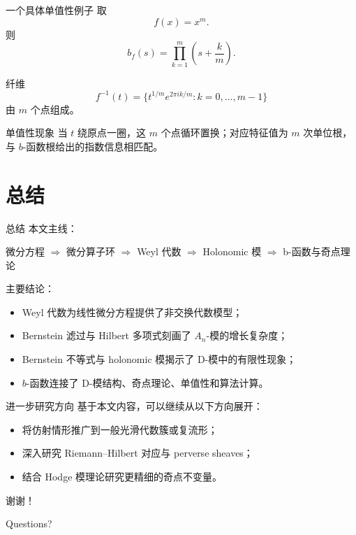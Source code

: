\documentclass[aspectratio=169,11pt]{ctexbeamer}
\begin{document}
\begin{frame}{一个具体单值性例子}
    取
    \[
        f(x)=x^m.
    \]
    则
    \[
        b_f(s)=\prod_{k=1}^m\left(s+\frac{k}{m}\right).
    \]

    纤维
    \[
        f^{-1}(t)=\{t^{1/m}e^{2\pi i k/m}:k=0,\dots,m-1\}
    \]
    由 $m$ 个点组成。

    \begin{block}{单值性现象}
        当 $t$ 绕原点一圈，这 $m$ 个点循环置换；对应特征值为 $m$ 次单位根，与 $b$-函数根给出的指数信息相匹配。
    \end{block}

\end{frame}






\section{总结}

\begin{frame}{总结}
    本文主线：

    \begin{center}
        微分方程
        $\Longrightarrow$
        微分算子环
        $\Longrightarrow$
        Weyl 代数
        $\Longrightarrow$
        Holonomic 模
        $\Longrightarrow$
        b-函数与奇点理论
    \end{center}

    \vspace{1em}
    主要结论：

    \begin{itemize}
        \item Weyl 代数为线性微分方程提供了非交换代数模型；
        \item Bernstein 滤过与 Hilbert 多项式刻画了 $A_n$-模的增长复杂度；
        \item Bernstein 不等式与 holonomic 模揭示了 D-模中的有限性现象；
        \item $b$-函数连接了 D-模结构、奇点理论、单值性和算法计算。
    \end{itemize}

\end{frame}

\begin{frame}{进一步研究方向}
    基于本文内容，可以继续从以下方向展开：

    \begin{itemize}
        \item 将仿射情形推广到一般光滑代数簇或复流形；
        \item 深入研究 Riemann--Hilbert 对应与 perverse sheaves；
        \item 结合 Hodge 模理论研究更精细的奇点不变量。
    \end{itemize}

\end{frame}





\begin{frame}
    \centering
    \Huge 谢谢！

    \vspace{1em}
    \Large Questions?
\end{frame}
\end{document}
